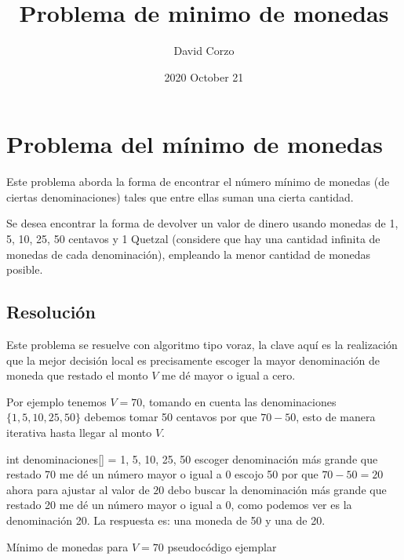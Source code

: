 \documentclass{article}
\title{Problema de minimo de monedas}
\date{2020 October 21} %
\author{David Corzo}
\begin{document}
\maketitle


\section{Problema del mínimo de monedas}
Este problema aborda la forma de encontrar el número mínimo de monedas (de ciertas 
denominaciones) tales que entre ellas suman una cierta cantidad. 

Se desea encontrar la forma de devolver un valor de dinero usando monedas de 1, 5, 10, 25, 50 
centavos y 1 Quetzal (considere que hay una cantidad infinita de monedas de cada 
denominación), empleando la menor cantidad de monedas posible. 

\subsection{Resolución}

Este problema se resuelve con algoritmo tipo voraz, la clave aquí es la realización que la mejor decisión local es precisamente escoger la mayor denominación de moneda que restado el monto $V$  me dé mayor o igual a cero.

Por ejemplo tenemos $V = 70$, tomando en cuenta las denominaciones $\{ 1,5,10,25,50 \}$ debemos tomar 50 centavos por que $70 - 50$, esto de manera iterativa hasta llegar al monto $V$.

\begin{center}
    \begin{algorithm}[H]
        \SetAlgoLined
        \large
        int denominaciones[] = {1, 5, 10, 25, 50}\;
        escoger denominación más grande que restado 70 me dé un número mayor o igual a 0\; 
        escojo 50 por que $70 - 50 = 20$\; 
        ahora para ajustar al valor de $20$ debo buscar la denominación más grande que restado 20 me dé un número mayor o igual a 0, como podemos ver es la denominación 20.\;
        La respuesta es: una moneda de 50 y una de 20.
        \caption{Mínimo de monedas para $V = 70$ pseudocódigo ejemplar}
    \end{algorithm}
\end{center}
\end{document}
